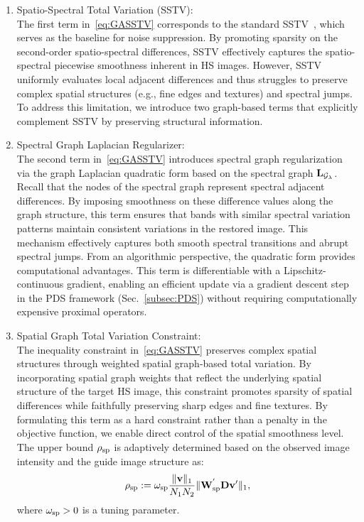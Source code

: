  \begin{enumerate}
    \item Spatio-Spectral Total Variation (SSTV): \\
    The first term in~\eqref{eq:GASSTV} corresponds to the standard SSTV~\cite{Aggarwal2016SSTV}, which serves as the baseline for noise suppression. By promoting sparsity on the second-order spatio-spectral differences, SSTV effectively captures the spatio-spectral piecewise smoothness inherent in HS images. However, SSTV uniformly evaluates local adjacent differences and thus struggles to preserve complex spatial structures (e.g., fine edges and textures) and spectral jumps. To address this limitation, we introduce two graph-based terms that explicitly complement SSTV by preserving structural information.

    \item Spectral Graph Laplacian Regularizer: \\
    The second term in~\eqref{eq:GASSTV} introduces spectral graph regularization via the graph Laplacian quadratic form based on the spectral graph $\mathbf{L}_{\mathcal{G}_{\lambda}}$. Recall that the nodes of the spectral graph represent spectral adjacent differences. By imposing smoothness on these difference values along the graph structure, this term ensures that bands with similar spectral variation patterns maintain consistent variations in the restored image. This mechanism effectively captures both smooth spectral transitions and abrupt spectral jumps.        
    From an algorithmic perspective, the quadratic form provides computational advantages. This term is differentiable with a Lipschitz-continuous gradient, enabling an efficient update via a gradient descent step in the PDS framework (Sec.~\ref{subsec:PDS}) without requiring computationally expensive proximal operators.
    
    \item Spatial Graph Total Variation Constraint: \\
    The inequality constraint in~\eqref{eq:GASSTV} preserves complex spatial structures through weighted spatial graph-based total variation. By incorporating spatial graph weights that reflect the underlying spatial structure of the target HS image, this constraint promotes sparsity of spatial differences while faithfully preserving sharp edges and fine textures.
    By formulating this term as a hard constraint rather than a penalty in the objective function, we enable direct control of the spatial smoothness level. The upper bound $\rho_{\text{sp}}$ is adaptively determined based on the observed image intensity and the guide image structure as: 
    \begin{equation}
        \label{eq:SpatialGraphRadius}
        \rho_{\text{sp}} := \omega_{\text{sp}} \frac{\|\mathbf{v} \|_{1}}{N_{1} N_{2}} \|\mathbf{W}_{\text{sp}}^{'} \mathbf{D} \mathbf{v}{'} \|_1,
    \end{equation} 
    where $\omega_{\text{sp}} > 0$ is a tuning parameter.

\end{enumerate}


